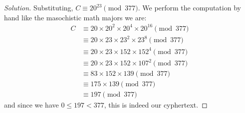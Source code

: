 \documentclass{agony}
\begin{document}
\begin{enumerate}[(a)]
\begin{proof}[Solution]
          Substituting, $C \equiv 20^{23} \pmod{377}$.
          We perform the computation by hand like the masochistic math majors we are:
          \begin{align*}
            C & \equiv 20 \times 20^2 \times 20^4 \times 20^{16} \pmod{377} \\
              & \equiv 20 \times 23 \times 23^2 \times 23^8 \pmod{377}      \\
              & \equiv 20 \times 23 \times 152 \times 152^4 \pmod{377}      \\
              & \equiv 20 \times 23 \times 152 \times 107^2 \pmod{377}      \\
              & \equiv 83 \times 152 \times 139 \pmod{377}                  \\
              & \equiv 175 \times 139 \pmod{377}                            \\
              & \equiv 197 \pmod{377}
          \end{align*}
          and since we have $0 \leq 197 < 377$, this is indeed our cyphertext.
        \end{proof}
\end{enumerate}
\end{document}
